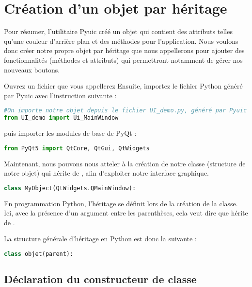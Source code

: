 \documentclass[12pt]{report}    %
\begin{document}
\section{Création d'un objet par héritage}

Pour résumer, l'utilitaire Pyuic créé un objet  qui contient des attributs telles qu'une couleur d'arrière plan et des méthodes pour l'application. \newline
Nous voulons donc créer notre propre objet par héritage que nous appellerons  pour ajouter des fonctionnalités (méthodes et attributs) qui permettront notamment de gérer nos nouveaux boutons. \newline

Ouvrez un fichier que vous appellerez 
Ensuite, importez le fichier Python généré par Pyuic avec l'instruction suivante :

\begin{lstlisting}[language=Python]
#On importe notre objet depuis le fichier UI_demo.py, généré par Pyuic
from UI_demo import Ui_MainWindow
\end{lstlisting}

puis importer les modules de base de PyQt :  
\begin{lstlisting}[language=Python]
from PyQt5 import QtCore, QtGui, QtWidgets
\end{lstlisting}

Maintenant, nous pouvons nous atteler à la création de notre classe  (structure de notre objet) qui hérite de , afin d'exploiter notre interface graphique.


\begin{lstlisting}[language=Python]
class MyObject(QtWidgets.QMainWindow):
\end{lstlisting}

En programmation Python, l'héritage se définit lors de la création de la classe.\newline
Ici, avec la présence d'un argument entre les parenthèses, cela veut dire que  hérite de .

La structure générale d'héritage en Python est donc la suivante : 
\begin{lstlisting}[language=Python]
class objet(parent):
\end{lstlisting}

\subsection{Déclaration du constructeur de classe}
\end{document}
